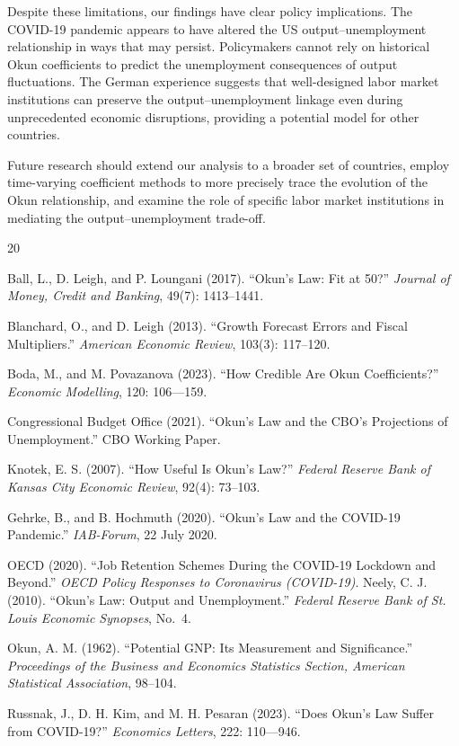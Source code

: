 \documentclass[12pt,a4paper]{article}
\begin{document}
Despite these limitations, our findings have clear policy implications. The COVID-19 pandemic appears to have altered the US output--unemployment relationship in ways that may persist. Policymakers cannot rely on historical Okun coefficients to predict the unemployment consequences of output fluctuations. The German experience suggests that well-designed labor market institutions can preserve the output--unemployment linkage even during unprecedented economic disruptions, providing a potential model for other countries.

Future research should extend our analysis to a broader set of countries, employ time-varying coefficient methods to more precisely trace the evolution of the Okun relationship, and examine the role of specific labor market institutions in mediating the output--unemployment trade-off.

\newpage


\begin{thebibliography}{20}

Ball, L., D. Leigh, and P. Loungani (2017). ``Okun's Law: Fit at 50?'' \textit{Journal of Money, Credit and Banking}, 49(7): 1413--1441.

Blanchard, O., and D. Leigh (2013). ``Growth Forecast Errors and Fiscal Multipliers.'' \textit{American Economic Review}, 103(3): 117--120.

Boda, M., and M. Povazanova (2023). ``How Credible Are Okun Coefficients?'' \textit{Economic Modelling}, 120: 106—159.

Congressional Budget Office (2021). ``Okun's Law and the CBO's Projections of Unemployment.'' CBO Working Paper.

Knotek, E. S. (2007). ``How Useful Is Okun's Law?'' \textit{Federal Reserve Bank of Kansas City Economic Review}, 92(4): 73--103.

Gehrke, B., and B. Hochmuth (2020). ``Okun's Law and the COVID-19 Pandemic.'' 
\textit{IAB-Forum}, 22 July 2020.

OECD (2020). ``Job Retention Schemes During the COVID-19 Lockdown and Beyond.'' 
\textit{OECD Policy Responses to Coronavirus (COVID-19)}.
Neely, C. J. (2010). ``Okun's Law: Output and Unemployment.'' \textit{Federal Reserve Bank of St. Louis Economic Synopses}, No.~4.

Okun, A. M. (1962). ``Potential GNP: Its Measurement and Significance.'' \textit{Proceedings of the Business and Economics Statistics Section, American Statistical Association}, 98--104.

Russnak, J., D. H. Kim, and M. H. Pesaran (2023). ``Does Okun's Law Suffer from COVID-19?'' \textit{Economics Letters}, 222: 110—946.

\end{thebibliography}
\end{document}
